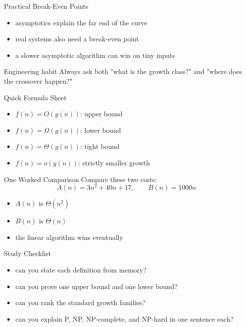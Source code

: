 \documentclass[aspectratio=169,xcolor=dvipsnames]{beamer}
\begin{document}
\begin{frame}{Practical Break-Even Points}
  \begin{itemize}
    \item asymptotics explain the far end of the curve
    \item real systems also need a break-even point
    \item a slower asymptotic algorithm can win on tiny inputs
  \end{itemize}
  \begin{exampleblock}{Engineering habit}
    Always ask both "what is the growth class?" and "where does the crossover happen?"
  \end{exampleblock}
\end{frame}

\begin{frame}{Quick Formula Sheet}
  \begin{itemize}
    \item $f(n)=O(g(n))$: upper bound
    \item $f(n)=\Omega(g(n))$: lower bound
    \item $f(n)=\Theta(g(n))$: tight bound
    \item $f(n)=o(g(n))$: strictly smaller growth
  \end{itemize}
\end{frame}

\begin{frame}{One Worked Comparison}
  Compare these two costs:
  \[
    A(n)=3n^2+40n+17,\qquad B(n)=1000n
  \]
  \begin{itemize}
    \item $A(n)$ is $\Theta(n^2)$
    \item $B(n)$ is $\Theta(n)$
    \item the linear algorithm wins eventually
  \end{itemize}
\end{frame}

\begin{frame}{Study Checklist}
  \begin{itemize}
    \item can you state each definition from memory?
    \item can you prove one upper bound and one lower bound?
    \item can you rank the standard growth families?
    \item can you explain P, NP, NP-complete, and NP-hard in one sentence each?
  \end{itemize}
\end{frame}
\end{document}
